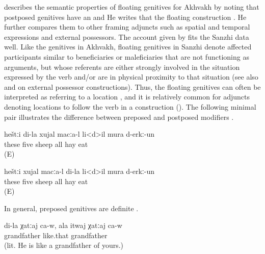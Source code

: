 \citet[346]{Creissels2013} describes the semantic properties of floating genitives for Akhvakh by noting that postposed genitives have an  and  He writes that the floating  construction  \citep[333]{Creissels2013}. He further compares them to other framing adjuncts such as spatial and temporal expressions and external possessors. The account given by  fits the Sanzhi data well. Like the genitives in Akhvakh, floating genitives in Sanzhi denote affected participants similar to beneficiaries or maleficiaries that are not functioning as arguments, but whose referents are either strongly involved in the situation expressed by the verb and/or are in physical proximity to that situation (see also \citealp{Shibatani1994} and \citealp{Serzhant2016} on external possessor constructions). Thus, the floating genitives can often be interpreted as referring to a location , and it is relatively common for adjuncts denoting locations to follow the verb in a  construction (). The following minimal pair illustrates the difference between preposed and postposed  modifiers .
%
\begin{exe}
	\ex	\label{ex:sheep eat hay minimal pair}
	\begin{xlist}
		\ex	\label{ex:‎My five sheep ate all the hay@A}
		\gll	heštːi	di-la	xujal	macːa-l	li<d>il	mura	d-erkː-un\\
			these		five	sheep	all	hay	eat\\
		\glt	{} (E)

		\ex	\label{ex:‎The five sheep of mine ate all the hay}
		\gll	heštːi	xujal	macːa-l	di-la	li<d>il	mura	d-erkː-un\\
			these		five	sheep	 all	hay	eat\\
		\glt	{} (E)
	\end{xlist}
\end{exe}

In general, preposed genitives are definite .
%
\begin{exe}
	\ex	\label{ex:‎(He) is my (real) grandfather. For you he is only an old man extraposed genitive}
	\gll	di-la	χatːaj	ca-w,	ala	itwaj	χatːaj	ca-w\\
			grandfather				like.that	grandfather	\\
	\glt	{} (lit. He is like a grandfather of yours.)
\end{exe}

